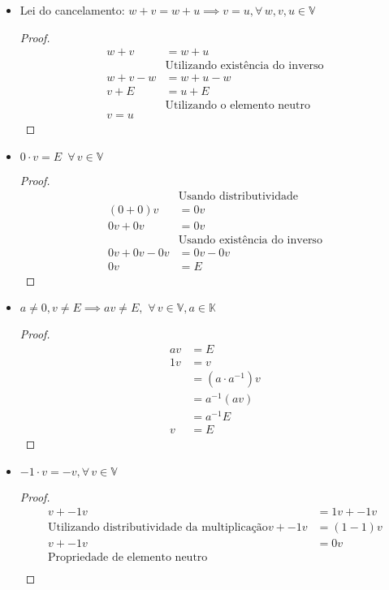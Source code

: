 \documentclass{article}
\theoremstyle{plain}
\theoremstyle{remark}
\numberwithin{equation}{section}
\numberwithin{thm}{section}
\numberwithin{defn}{section}
\numberwithin{lemma}{section}
\numberwithin{axm}{section}
\begin{document}
\begin{itemize}
	\item Lei do cancelamento: \(w + v = w + u \implies v = u, \forall \, w, v, u \in \mathbb{V}\)
	\begin{proof}
		\begin{align*}
			w + v &= w + u\\
			&\text{Utilizando existência do inverso}\\
			w + v - w &= w + u - w\\
			v + E &= u + E\\
			&\text{Utilizando o elemento neutro}\\
			v = u
		\end{align*}		
		\end{proof}
		\item \( 0\cdot v = E \, \, \, \forall \,  v \in \mathbb{V}\)
	\begin{proof}
		\begin{align*}
			&\text{Usando distributividade}\\
			(0+0) v &= 0v \\
			0v + 0v &= 0v \\
			&\text{Usando existência do inverso}\\
			0v + 0v - 0v &= 0v - 0v \\
			0v &= E
		\end{align*}		
	\end{proof}
			\item \( a \neq 0, v \neq E \implies av \neq E, \, \, \forall \,  v \in \mathbb{V}, a \in \mathbb{K}\)
	\begin{proof}
		\begin{align*}
			av &= E \\
			1v &= v\\
			&= (a \cdot a^{-1}) v\\
			&= a^{-1}(av) \\
			&=a^{-1} E\\
			v &= E
		\end{align*}		
	\end{proof}
	\item \(-1 \cdot v = -v, \forall \, v \in \mathbb{V}\)
	\begin{proof}
		\begin{align*}
			v + -1v &= 1v + -1v\\
			\text{Utilizando distributividade da multiplicação}
			v + -1v &= (1 - 1) v\\
			v + -1v &= 0v\\
			\text{Propriedade de elemento neutro}\\

\end{align*}
\end{proof}
\end{itemize}
\end{document}
